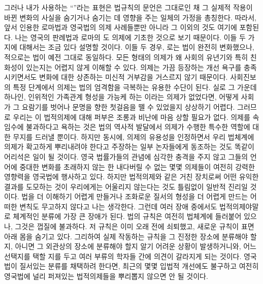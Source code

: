 그러나 내가 사용하는 ``''라는 표현은
법규칙의 문언은 그대로인 채 그 실제적 작용이 바뀐 변화의 사실을
숨기거나 숨기는 데 영향을 주는 일체의 가정을 총칭한다.
따라서, 앞서 인용한 로마법과 영국법의 의제 사례들뿐만 아니라
그 이외의 것도 여기에 포함된다. 나는 영국의 판례법과 로마의
도 의제에 기초한 것으로 보기 때문이다.
이들 두 가지에 대해서는 조금 있다 설명할 것이다.
이들 두 경우, 로는 법이 완전히 변화했으나,
적으로는 법이 예전 그대로 동일하다.
모든 형태의 의제가 왜 사회의 유년기와 특히 친화성이 있는지는 어렵지 않게
이해할 수 있다.
의제는 가끔 등장하는 개선 욕구를 충족시키면서도
변화에 대한 상존하는 미신적 거부감을 거스르지 않기 때문이다.
사회진보의 특정 단계에서 의제는 법의 엄격함을 극복하는 유용한 수단이 된다.
실로 그 가운데 하나인, 인위적인 가족관계 형성을 가능케 하는
이라는 의제가 없었다면, 어떻게 사회가 그 요람기를 벗어나
문명을 향한 첫걸음을 뗄 수 있었을지 상상하기 어렵다.
그러므로 우리는 이 법적의제에 대해 퍼부은 조롱과 비난에 마음 상할
필요가 없다.
의제를 속임수에 불과하다고 욕하는 것은 법의 역사적 발달에서
의제가 수행한 특수한 역할에 대한 무지를 드러낼 뿐이다.
하지만 동시에, 의제의 유용성을 인정하면서 우리 법체계에 의제가
확고하게 뿌리내려야 한다고 주장하는 일부 논자들에게 동조하는 것도 똑같이
어리석은 일이 될 것이다.
영국 법률가들의 관념에 심각한 충격을 주지 않고
그들의 언어에 중대한 변화를 초래하지 않는 한
내다버릴 수 없는 몇몇 의제들이 여전히 강력한 영향력을 영국법에 행사하고 있다.
하지만 법적의제와 같은 거친 장치로써 어떤 유익한 결과를 도모하는 것이
우리에게는 어울리지 않는다는 것도 틀림없이 일반적 진리일 것이다.
법을 더 이해하기 어렵게 만들거나 조화로운 질서의 형성을 더 어렵게 만드는
어떠한 변칙도 무고하지 않다고 나는 생각한다.
그런데 여러 장애 중에서도 법적의제야말로 체계적인 분류에 가장 큰
장애가 된다.
법의 규칙은 여전히 법체계에 들러붙어 있으나,
그것은 껍질에 불과하다.
저 규칙은 이미 오래 전에 쇠퇴했고, 새로운 규칙이 표면 아래 몸을 숨기고 있다.
그리하여 실제 작동하는 규칙을 그 진정한 장소에 분류해야 할지,
아니면 그 외관상의 장소에 분류해야 할지 알기 어려운 상황이 발생하거니와,
어느 선택지를 택할 지를 두고 여러 부류의 학자들 간에 의견이
갈라지게 되는 것이다.
영국법이 질서있는 분류를 채택하려 한다면,
최근의 몇몇 입법적 개선에도 불구하고 여전히 영국법에 널리 퍼져있는
법적의제들을 뿌리뽑지 않으면 안 될 것이다.

